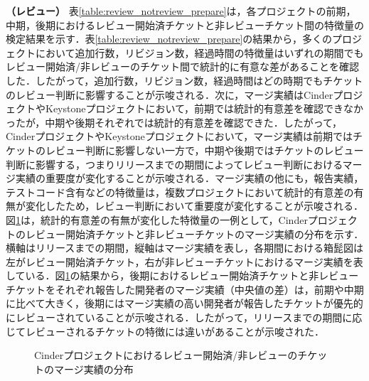 \documentclass[submit]{ipsj}
\begin{document}
\textbf{（レビュー）} 表\ref{table:review_notreview_prepare}は，各プロジェクトの前期，中期，後期におけるレビュー開始済チケットと非レビューチケット間の特徴量の検定結果を示す．表\ref{table:review_notreview_prepare}の結果から，多くのプロジェクトにおいて追加行数，リビジョン数，経過時間の特徴量はいずれの期間でもレビュー開始済/非レビューのチケット間で統計的に有意な差があることを確認した．したがって，追加行数，リビジョン数，経過時間はどの時期でもチケットのレビュー判断に影響することが示唆される．次に，マージ実績はCinderプロジェクトやKeystoneプロジェクトにおいて，前期では統計的有意差を確認できなかったが，中期や後期それぞれでは統計的有意差を確認できた．したがって，CinderプロジェクトやKeystoneプロジェクトにおいて，マージ実績は前期ではチケットのレビュー判断に影響しない一方で，中期や後期ではチケットのレビュー判断に影響する，つまりリリースまでの期間によってレビュー判断におけるマージ実績の重要度が変化することが示唆される．マージ実績の他にも，報告実績，テストコード含有などの特徴量は，複数プロジェクトにおいて統計的有意差の有無が変化したため，レビュー判断において重要度が変化することが示唆される．
図\ref{fig:review_notreview}は，統計的有意差の有無が変化した特徴量の一例として，Cinderプロジェクトのレビュー開始済チケットと非レビューチケットのマージ実績の分布を示す．横軸はリリースまでの期間，縦軸はマージ実績を表し，各期間における箱髭図は左がレビュー開始済チケット，右が非レビューチケットにおけるマージ実績を表している．図\ref{fig:review_notreview}の結果から，後期におけるレビュー開始済チケットと非レビューチケットをそれぞれ報告した開発者のマージ実績（中央値の差）は，前期や中期に比べて大きく，後期にはマージ実績の高い開発者が報告したチケットが優先的にレビューされていることが示唆される．したがって，リリースまでの期間に応じてレビューされるチケットの特徴には違いがあることが示唆された．


\begin{figure}[h]
\begin{center}
\caption{Cinderプロジェクトにおけるレビュー開始済/非レビューのチケットのマージ実績の分布}
\label{fig:review_notreview}
\end{center}
\end{figure}
\end{document}
